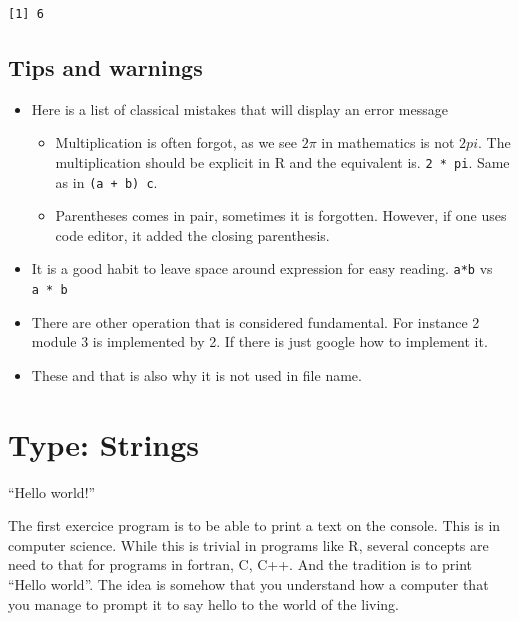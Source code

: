 \documentclass[
  letterpaper,
  DIV=11,
  numbers=noendperiod]{scrreprt}
\providecommand{\tightlist}{%
  \setlength{\itemsep}{0pt}\setlength{\parskip}{0pt}}
\begin{document}
\begin{verbatim}
[1] 6
\end{verbatim}

\section*{Tips and warnings}\label{tips-and-warnings-23}


\begin{itemize}
\tightlist
\item
  Here is a list of classical mistakes that will display an error
  message

  \begin{itemize}
  \tightlist
  \item
    Multiplication is often forgot, as we see \(2\pi\) in mathematics is
    not \(2 pi\). The multiplication should be explicit in R and the
    equivalent is. \texttt{2\ *\ pi}. Same as in \texttt{(a\ +\ b)\ c}.
  \item
    Parentheses comes in pair, sometimes it is forgotten. However, if
    one uses code editor, it added the closing parenthesis.
  \end{itemize}
\item
  It is a good habit to leave space around expression for easy reading.
  \texttt{a*b} vs \texttt{a\ *\ b}
\item
  There are other operation that is considered fundamental. For instance
  2 module 3 is implemented by 2. If there is just google how to
  implement it.
\item
  These and that is also why it is not used in file name.
\end{itemize}

\chapter{Type: Strings}\label{sec-character}

``Hello world!''

The first exercice program is to be able to print a text on the console.
This is in computer science. While this is trivial in programs like R,
several concepts are need to that for programs in fortran, C, C++. And
the tradition is to print ``Hello world''. The idea is somehow that you
understand how a computer that you manage to prompt it to say hello to
the world of the living.
\end{document}
